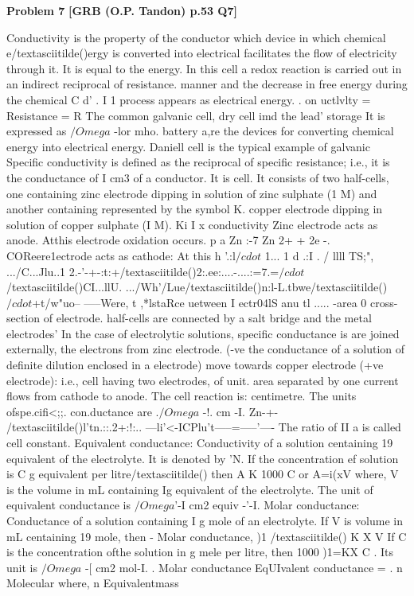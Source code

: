 \begin{problembox}
\textbf{Problem 7} \hfill \textbf{[GRB (O.P. Tandon) p.53 Q7]}
\label{q:ext-grb_all_questions-7}

Conductivity is the property of the conductor which 
device in which chemical e/textasciitilde()ergy is converted into electrical 
facilitates the flow of electricity through it. It is equal to the 
energy. In this cell a redox reaction is carried out in an indirect 
reciprocal of resistance. 
manner and the decrease in free energy during the chemical 
C d' . 
I 
1 
process appears as electrical energy. 
. 
on uctlvlty = Resistance = R 
The common galvanic cell, dry cell imd the lead' storage 
It is expressed as $/Omega$ -lor mho. 
battery a,re the devices for converting chemical energy into 
electrical energy. Daniell cell is the typical example of galvanic 
Specific conductivity is defined as the reciprocal of specific 
resistance; i.e., it is the conductance of I cm3 of a conductor. It is 
cell. It consists of two half-cells, one containing zinc electrode 
dipping in solution of zinc sulphate (1 M) and another containing 
represented by the symbol K. 
copper electrode dipping in solution of copper sulphate (I M). 
Ki 
I x conductivity 
Zinc electrode acts as anode. Atthis electrode oxidation occurs. 
p 
a 
Zn :-7 Zn 2+ + 2e -. COReere1ectrode acts as cathode: At this 
h
'.:l$/cdot$ 
1... 
1 
d 
.:I 
. /%
llll
TS;", .../C...Jlu..1 2.-'-+-:t:+/textasciitilde()2:.ee:....-....:=7.=$/cdot$ 
/textasciitilde()CI...llU\underline{\hspace{1cm}}. .../Wh'/Lue/textasciitilde()n:l-L.tbwe/textasciitilde()$/cdot$+t/w"uo--
-----Were, 
t 
,*lstaRce uetween 
 I ectr04lS anu 
tl ..... -area 0 
cross-section of electrode. 
half-cells are connected by a salt bridge and the metal electrodes' 
In the case of electrolytic solutions, specific conductance is 
are joined externally, the electrons from zinc electrode. (-ve 
the conductance of a solution of definite dilution enclosed in a 
electrode) move towards copper electrode (+ve electrode): i.e., 
cell having two electrodes, of unit. area separated by one 
current flows from cathode to anode. The cell reaction is: 
centimetre. The units ofspe.cifi<;;. con.ductance are .$/Omega$ -!. cm -I. 
Zn-+- /textasciitilde()l'tn.::.2+:!:.. ---li'<-ICPlu't-----=-----'----
The ratio of II a is called cell constant. 
Equivalent conductance: Conductivity of a solution 
centaining 19 equivalent of the electrolyte. It is denoted by 'N. If 
the concentration ef solution is C g equivalent per litre/textasciitilde() then 
A 
K 1000 
C 
or 
A=i(xV 
where, V is the volume in mL containing Ig equivalent of the 
electrolyte. The unit of equivalent conductance is $/Omega$'-I cm2 
equiv -'-I. 
Molar conductance: Conductance of a solution containing 
I g mole of an electrolyte. If V is volume in mL centaining 19 
mole, then 
-
Molar conductance, )1 /textasciitilde() K X V 
If C is the concentration ofthe solution in g mele per litre, then 
1000 
)1=KX 
C 
. Its unit is $/Omega$ -[ cm2 mol-I. 
. 
Molar conductance 
EqUIvalent conductance = 
. 
n 
Molecular 
where, 
n 
Equivalentmass
\end{problembox}

